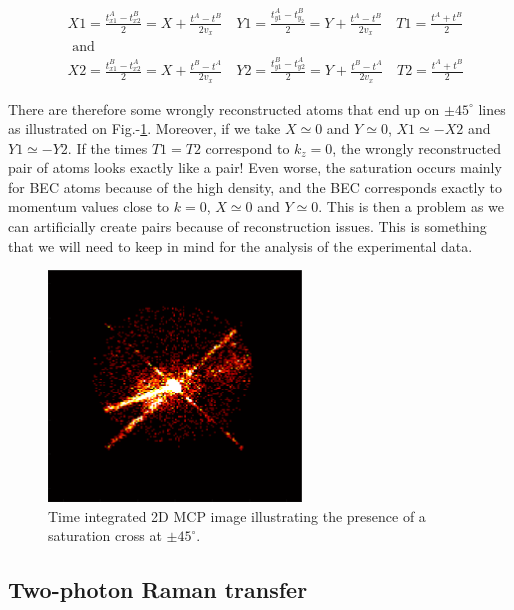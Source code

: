 \begin{equation}
\begin{aligned}
&X 1=\frac{t_{x 1}^{A}-t_{x 2}^{B}}{2}=X+\frac{t^{A}-t^{B}}{2 v_{x}} \quad Y 1=\frac{t_{y 1}^{A}-t_{y_{2}}^{B}}{2}=Y+\frac{t^{A}-t^{B}}{2 v_{x}} \quad T 1=\frac{t^{A}+t^{B}}{2}\\
&\text { and }\\
&X 2=\frac{t_{x 1}^{B}-t_{x 2}^{A}}{2}=X+\frac{t^{B}-t^{A}}{2 v_{x}} \quad Y 2=\frac{t_{y 1}^{B}-t_{y 2}^{A}}{2}=Y+\frac{t^{B}-t^{A}}{2 v_{x}} \quad T 2=\frac{t^{A}+t^{B}}{2}
\end{aligned}
\end{equation}

There are therefore some wrongly reconstructed atoms that end up on $\pm 45^{\circ}$ lines as illustrated on Fig.-\ref{fig:saturation_cross}. Moreover, if we take $X \simeq 0$ and $Y \simeq 0$, $X1 \simeq -X2$ and $Y1 \simeq -Y2$. If the times $T1=T2$ correspond to $k_z=0$, the wrongly reconstructed pair of atoms looks exactly like a \kmk pair! Even worse, the saturation occurs mainly for BEC atoms because of the high density, and the BEC corresponds exactly to momentum values close to $k=0$, \ie  $X \simeq 0$ and $Y \simeq 0$. This is then a problem as we can artificially create \kmk pairs because of reconstruction issues. This is something that we will need to keep in mind for the analysis of the experimental data.

\begin{figure}
    \centering
    \includegraphics[width=0.6\textwidth]{Fig/Chapter3/saturation_cross.png}
    \caption[Saturation cross]{Time integrated 2D MCP image illustrating the presence of a saturation cross at $\pm 45^{\circ}$.}
    \label{fig:saturation_cross}
\end{figure}


\subsection{Two-photon Raman transfer}

